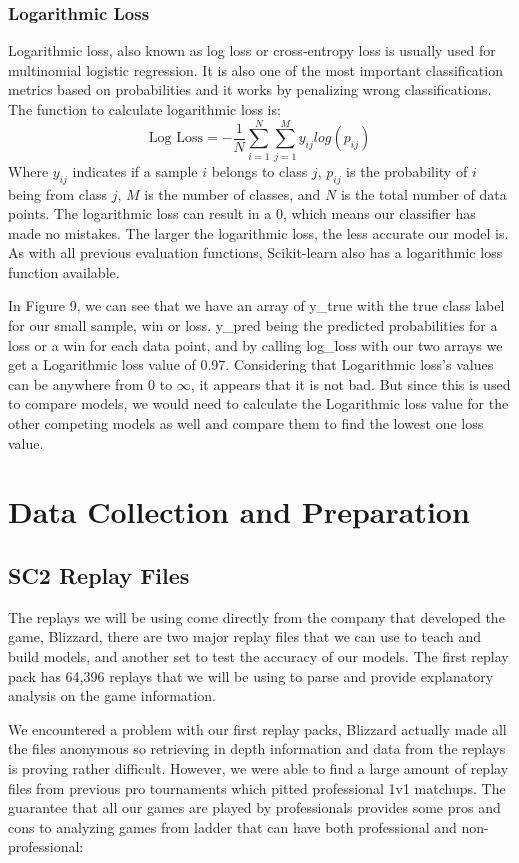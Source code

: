 \documentclass[a4paper,12pt]{report}
\begin{document}
\subsubsection{Logarithmic Loss}

Logarithmic loss, also known as log loss or cross-entropy loss is usually used for multinomial logistic regression. It is also one of the most important classification metrics based on probabilities and it works by penalizing wrong classifications. The function to calculate logarithmic loss is:
$$\text{Log Loss} = -\frac{1}{N}\sum_{i=1}^N\sum_{j=1}^My_{ij}log(p_{ij})$$
Where $y_{ij}$ indicates if a sample $i$ belongs to class $j$, $p_{ij}$ is the probability of $i$ being from class $j$, $M$ is the number of classes, and $N$ is the total number of data points. The logarithmic loss can result in a 0, which means our classifier has made no mistakes. The larger the logarithmic loss, the less accurate our model is. As with all previous evaluation functions, Scikit-learn also has a logarithmic loss function available.


In Figure 9, we can see that we have an array of y\_true with the true class label for our small sample, win or loss. y\_pred being the predicted probabilities for a loss or a win for each data point, and by calling log\_loss with our two arrays we get a Logarithmic loss value of 0.97. Considering that Logarithmic loss’s values can be anywhere from 0 to $\infty$, it appears that it is not bad. But since this is used to compare models, we would need to calculate the Logarithmic loss value for the other competing models as well and compare them to find the lowest one loss value.

\section{Data Collection and Preparation}

\subsection{SC2 Replay Files}
The replays we will be using come directly from the company that developed the game, Blizzard, there are two major replay files that we can use to teach and build models, and another set to test the accuracy of our models. The first replay pack has 64,396 replays that we will be using to parse and provide explanatory analysis on the game information.

We encountered a problem with our first replay packs, Blizzard actually made all the files anonymous so retrieving in depth information and data from the replays is proving rather difficult. However, we were able to find a large amount of replay files from previous pro tournaments which pitted professional 1v1 matchups. The guarantee that all our games are played by professionals provides some pros and cons to analyzing games from ladder that can have both professional and non-professional:
\end{document}
